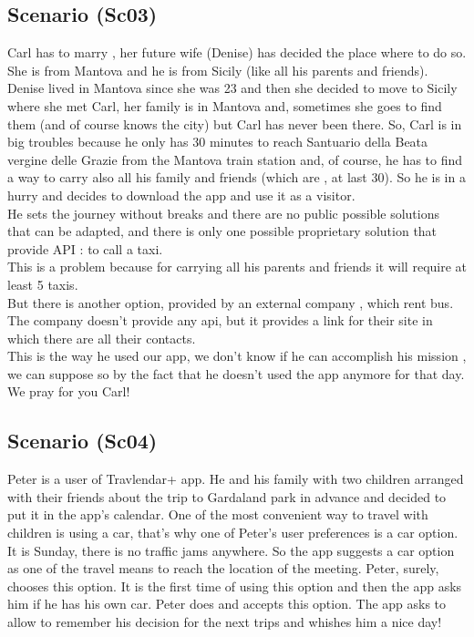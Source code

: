 \documentclass[a4paper,leqno]{book}
\begin{document}
\subsection{Scenario (Sc03) }
Carl has to marry , her future wife (Denise) has decided the place where to do so.\\
She is from Mantova and he is from Sicily (like all his parents and friends).\\
Denise lived in Mantova since she was 23 and then she decided to move to Sicily where she met Carl, her family is in Mantova and, sometimes she goes to find them (and of course knows the city) but Carl has never been there.
So, Carl is in big troubles because he only has 30 minutes to reach Santuario della Beata vergine delle Grazie from the Mantova train station and, of course, he has to find a way to carry also all his family and friends (which are , at last 30).
So he is in a hurry and decides to download the app and use it as a visitor.\\
He sets the journey without breaks and there are no public possible solutions that can be adapted, and there is only one possible proprietary solution that provide API : to call a taxi.\\
This is a problem because for carrying all his parents and friends it will require at least 5 taxis.\\
But there is another option, provided by an external company , which rent bus.\\
The company doesn't provide any api, but it provides a link for their site in which there are all their contacts.\\
This is the way he used our app, we don't know if he can accomplish his mission , we can suppose so by the fact that he doesn't used the app anymore for that day.\\
We pray for you Carl!\\

\subsection{Scenario (Sc04)}
Peter is a user of Travlendar+ app. He and his family with two children arranged with their friends about the trip to Gardaland park in advance and decided to put it in the app’s calendar. One of the most convenient way to travel with children is using a car, that’s why one of Peter’s user preferences is a car option. It is Sunday, there is no traffic jams anywhere. So the app suggests a car option as one of the travel means to reach the location of the meeting. Peter, surely, chooses this option. It is the first time of using this option and then the app asks him if he has his own car. Peter does and accepts this option. The app asks to allow to remember his decision for the next trips and whishes him a nice day!
\end{document}

